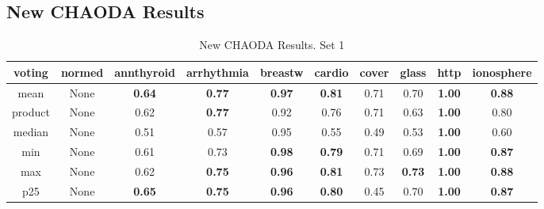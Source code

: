\subsection{New CHAODA Results}
\label{subsec:results:new-chaoda-results}

\begin{table*}[!b]
    \renewcommand{\arraystretch}{1.25}
    \caption{New CHAODA Results. Set 1}
    \label{table:results:new-chaoda-1}
    \centering
    \begin{tabular}{|c|c|c|c|c|c|c|c|c|c|}
        \hline
        \textbf{voting} & \textbf{normed} & \textbf{\textbf{annthyroid}} & \textbf{\textbf{arrhythmia}} & \textbf{\textbf{breastw}} & \textbf{\textbf{cardio}} & \textbf{\textbf{cover}} & \textbf{\textbf{glass}} & \textbf{\textbf{http}} & \textbf{\textbf{ionosphere}} \\
        \hline
                   mean &            None &                \textbf{0.64} &                \textbf{0.77} &             \textbf{0.97} &            \textbf{0.81} &                    0.71 &                    0.70 &          \textbf{1.00} &                \textbf{0.88} \\
        \hline
                product &            None &                         0.62 &                \textbf{0.77} &                      0.92 &                     0.76 &                    0.71 &                    0.63 &          \textbf{1.00} &                         0.80 \\
        \hline
                 median &            None &                         0.51 &                         0.57 &                      0.95 &                     0.55 &                    0.49 &                    0.53 &          \textbf{1.00} &                         0.60 \\
        \hline
                    min &            None &                         0.61 &                         0.73 &             \textbf{0.98} &            \textbf{0.79} &                    0.71 &                    0.69 &          \textbf{1.00} &                \textbf{0.87} \\
        \hline
                    max &            None &                         0.62 &                \textbf{0.75} &             \textbf{0.96} &            \textbf{0.81} &                    0.73 &           \textbf{0.73} &          \textbf{1.00} &                \textbf{0.88} \\
        \hline
                    p25 &            None &                \textbf{0.65} &                \textbf{0.75} &             \textbf{0.96} &            \textbf{0.80} &                    0.45 &                    0.70 &          \textbf{1.00} &                \textbf{0.87} \\

\end{tabular}
\end{table*}
